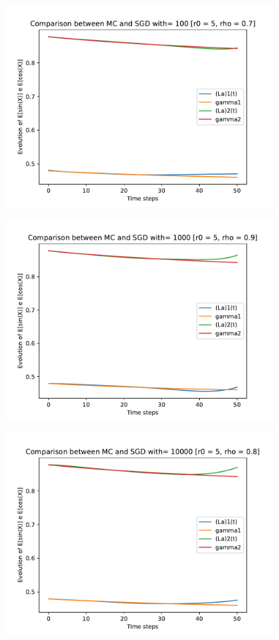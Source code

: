 \documentclass[a4paper,11pt,openright]{report}
\begin{document}
\begin{figure}[H]
\centering
\includegraphics[width=0.9\textwidth]{images/graphs T = 0.5/n = 6, M = 100 sine and cosine.pdf}
\end{figure}
\begin{figure}[H]
\centering
\includegraphics[width=0.9\textwidth]{images/graphs T = 0.5/n = 6, M = 1000 sine and cosine.pdf}
\end{figure}
\begin{figure}[H]
\centering
\includegraphics[width=0.9\textwidth]{images/graphs T = 0.5/n = 6, M = 10000 sine and cosine.pdf}
\end{figure}
\newpage
\end{document}
